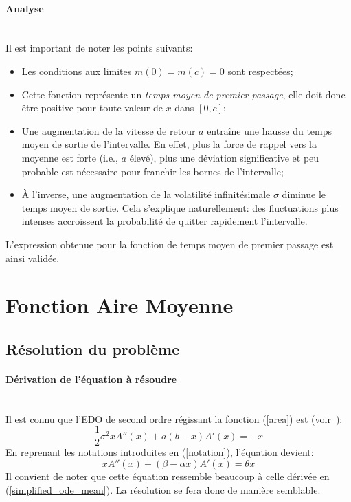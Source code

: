 \FloatBarrier\paragraph{Analyse}\phantom{}\\
Il est important de noter les points suivants:
\begin{itemize}
    \item Les conditions aux limites $m(0)=m(c)=0$ sont respectées;
    \item Cette fonction représente un \textit{temps moyen de premier passage}, elle doit donc être positive pour toute valeur de $x$ dans $[0,c]$;
    \item Une augmentation de la vitesse de retour $a$ entraîne une hausse du temps moyen de sortie de l'intervalle. En effet, plus la force de rappel vers la moyenne est forte (i.e., $a$ élevé), plus une déviation significative et peu probable est nécessaire pour franchir les bornes de l'intervalle;
    \item À l'inverse, une augmentation de la volatilité infinitésimale $\sigma$ diminue le temps moyen de sortie. Cela s'explique naturellement: des fluctuations plus intenses accroissent la probabilité de quitter rapidement l'intervalle.
\end{itemize}

L'expression obtenue pour la fonction de temps moyen de premier passage est ainsi validée.

\section{Fonction Aire Moyenne}
\subsection{Résolution du problème}
\paragraph{Dérivation de l'équation à résoudre}\phantom{}\\
Il est connu que l'\acs{EDO} de second ordre régissant la fonction (\ref{area}) est (voir~\cite{abundo2013}): 
\[\frac{1}{2}\sigma^2xA''(x)+a(b-x)A'(x)=-x\]
En reprenant les notations introduites en (\ref{notation}), l'équation devient: 
\[xA''(x)+(\beta-\alpha x)A'(x)=\theta x\]
Il convient de noter que cette équation ressemble beaucoup à celle dérivée en (\ref{simplified_ode_mean}). La résolution se fera donc de manière semblable.

